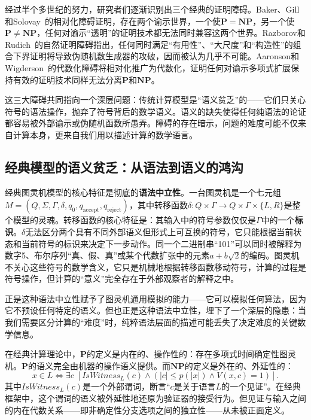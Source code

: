 \documentclass{ctexart}
\begin{document}
	经过半个多世纪的努力，研究者们逐渐识别出三个经典的证明障碍。Baker、Gill和Solovay~\cite{baker1975}的相对化障碍证明，存在两个谕示世界，一个使$\mathbf{P}=\mathbf{NP}$，另一个使$\mathbf{P}\neq\mathbf{NP}$，任何对谕示``透明''的证明技术都无法同时兼容这两个世界。Razborov和Rudich~\cite{razborov1997}的自然证明障碍指出，任何同时满足``有用性''、``大尺度''和``构造性''的组合下界证明将导致伪随机数生成器的攻破，因而被认为几乎不可能。Aaronson和Wigderson~\cite{aaronson2009}的代数化障碍将相对化推广为代数化，证明任何对谕示多项式扩展保持有效的证明技术同样无法分离$\mathbf{P}$和$\mathbf{NP}$。
	
	这三大障碍共同指向一个深层问题：传统计算模型是``语义贫乏''的——它们只关心符号的语法操作，抛弃了符号背后的数学语义。语义的缺失使得任何纯语法的论证都容易被外部谕示或伪随机函数所愚弄。障碍的存在暗示，问题的难度可能不仅来自计算本身，更来自我们用以描述计算的数学语言。
	
	\subsection{经典模型的语义贫乏：从语法到语义的鸿沟}
	
	经典图灵机模型的核心特征是彻底的\textbf{语法中立性}。一台图灵机是一个七元组$M = (Q, \Sigma, \Gamma, \delta, q_0, q_{\text{accept}}, q_{\text{reject}})$，其中转移函数$\delta: Q \times \Gamma \to Q \times \Gamma \times \{L, R\}$是整个模型的灵魂。转移函数的核心特征是：其输入中的符号参数仅仅是$\Gamma$中的一个\textbf{标识}。$\delta$无法区分两个具有不同外部语义但形式上可互换的符号，它只能根据当前状态和当前符号的标识来决定下一步动作。同一个二进制串``101''可以同时被解释为数字5、布尔序列``真、假、真''或某个代数扩张中的元素$a+b\sqrt{2}$的编码。图灵机不关心这些符号的数学含义，它只是机械地根据转移函数移动符号，计算的过程是符号操作，但计算的``意义''完全存在于外部观察者的解释之中。
	
	正是这种语法中立性赋予了图灵机通用模拟的能力——它可以模拟任何算法，因为它不预设任何特定的语义。但也正是这种语法中立性，埋下了一个深层的隐患：当我们需要区分计算的``难度''时，纯粹语法层面的描述可能丢失了决定难度的关键数学信息。
	
	在经典计算理论中，$\mathbf{P}$的定义是内在的、操作性的：存在多项式时间确定性图灵机。$\mathbf{P}$的语义完全由机器的操作语义提供。而$\mathbf{NP}$的定义是外在的、外延性的：
	\[
	x \in L \iff \exists c \; [IsWitness_L(c) \land (|c| \le p(|x|) \land V(x, c) = 1)].
	\]
	其中$IsWitness_L(c)$是一个外部谓词，断言``$c$是关于语言$L$的一个见证''。在经典框架中，这个谓词的语义被外延性地还原为验证器的接受行为。但见证与输入之间的内在代数关系——即非确定性分支选项之间的独立性——从未被正面定义。
	
\end{document}
